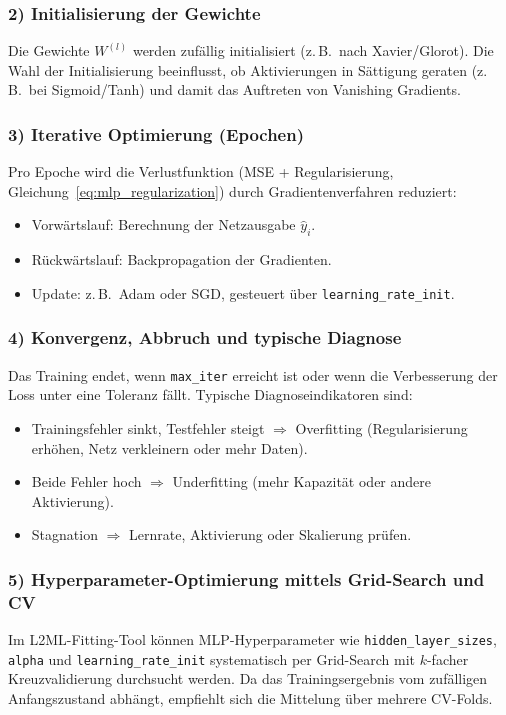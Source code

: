 \documentclass[11pt,a4paper]{report}
\begin{document}
\subsubsection{2) Initialisierung der Gewichte}
Die Gewichte $W^{(l)}$ werden zuf\"{a}llig initialisiert (z.\,B.\ nach Xavier/Glorot).
Die Wahl der Initialisierung beeinflusst, ob Aktivierungen in S\"{a}ttigung geraten
(z.\,B.\ bei Sigmoid/Tanh) und damit das Auftreten von Vanishing Gradients.

\subsubsection{3) Iterative Optimierung (Epochen)}
Pro Epoche wird die Verlustfunktion (MSE + Regularisierung,
Gleichung~\ref{eq:mlp_regularization}) durch Gradientenverfahren reduziert:
\begin{itemize}
\item Vorw\"{a}rtslauf: Berechnung der Netzausgabe $\hat{y}_i$.
\item R\"{u}ckw\"{a}rtslauf: Backpropagation der Gradienten.
\item Update: z.\,B.\ Adam oder SGD, gesteuert \"{u}ber \texttt{learning\_rate\_init}.
\end{itemize}

\subsubsection{4) Konvergenz, Abbruch und typische Diagnose}
Das Training endet, wenn \texttt{max\_iter} erreicht ist oder wenn die Verbesserung der
Loss unter eine Toleranz f\"{a}llt. Typische Diagnoseindikatoren sind:
\begin{itemize}
\item Trainingsfehler sinkt, Testfehler steigt $\Rightarrow$ Overfitting
      (Regularisierung erh\"{o}hen, Netz verkleinern oder mehr Daten).
\item Beide Fehler hoch $\Rightarrow$ Underfitting
      (mehr Kapazit\"{a}t oder andere Aktivierung).
\item Stagnation $\Rightarrow$ Lernrate, Aktivierung oder Skalierung pr\"{u}fen.
\end{itemize}

\subsubsection{5) Hyperparameter-Optimierung mittels Grid-Search und CV}
Im L2ML-Fitting-Tool k\"{o}nnen MLP-Hyperparameter wie \texttt{hidden\_layer\_sizes},
\texttt{alpha} und \texttt{learning\_rate\_init} systematisch per Grid-Search mit
$k$-facher Kreuzvalidierung durchsucht werden. Da das Trainingsergebnis vom zuf\"{a}lligen
Anfangszustand abh\"{a}ngt, empfiehlt sich die Mittelung \"{u}ber mehrere CV-Folds.
\end{document}
